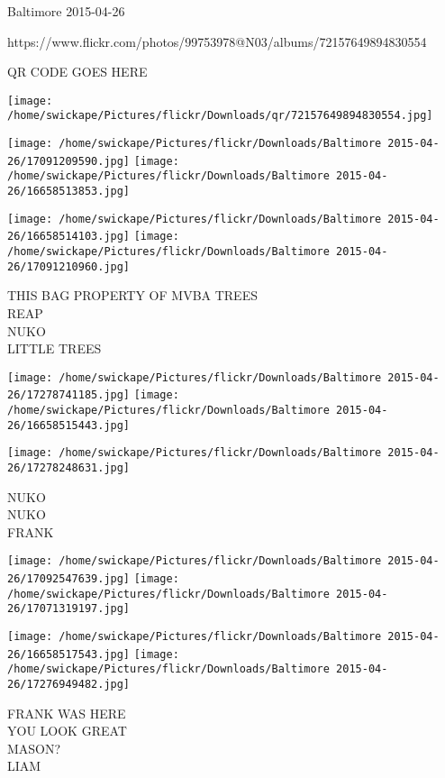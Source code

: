 \documentclass[10pt,letterpaper]{article}
\begin{document}
Baltimore 2015-04-26

https://www.flickr.com/photos/99753978@N03/albums/72157649894830554

QR CODE GOES HERE

\texttt{[image: /home/swickape/Pictures/flickr/Downloads/qr/72157649894830554.jpg]}
\pagebreak

\texttt{[image: /home/swickape/Pictures/flickr/Downloads/Baltimore 2015-04-26/17091209590.jpg]}
\texttt{[image: /home/swickape/Pictures/flickr/Downloads/Baltimore 2015-04-26/16658513853.jpg]}

\texttt{[image: /home/swickape/Pictures/flickr/Downloads/Baltimore 2015-04-26/16658514103.jpg]}
\texttt{[image: /home/swickape/Pictures/flickr/Downloads/Baltimore 2015-04-26/17091210960.jpg]}

THIS BAG PROPERTY OF MVBA TREES\\
REAP\\
NUKO\\
LITTLE TREES\\
\pagebreak

\texttt{[image: /home/swickape/Pictures/flickr/Downloads/Baltimore 2015-04-26/17278741185.jpg]}
\texttt{[image: /home/swickape/Pictures/flickr/Downloads/Baltimore 2015-04-26/16658515443.jpg]}

\vspace{0.25in}
\texttt{[image: /home/swickape/Pictures/flickr/Downloads/Baltimore 2015-04-26/17278248631.jpg]}

NUKO\\
NUKO\\
FRANK\\
\pagebreak

\texttt{[image: /home/swickape/Pictures/flickr/Downloads/Baltimore 2015-04-26/17092547639.jpg]}
\texttt{[image: /home/swickape/Pictures/flickr/Downloads/Baltimore 2015-04-26/17071319197.jpg]}

\texttt{[image: /home/swickape/Pictures/flickr/Downloads/Baltimore 2015-04-26/16658517543.jpg]}
\texttt{[image: /home/swickape/Pictures/flickr/Downloads/Baltimore 2015-04-26/17276949482.jpg]}

FRANK WAS HERE\\
YOU LOOK GREAT\\
MASON?\\
LIAM\\
\pagebreak
\end{document}
